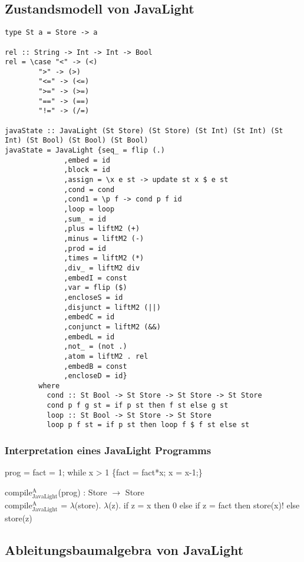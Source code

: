 \documentclass[11pt]{article}
\begin{document}
\subsection{Zustandsmodell von JavaLight}
\label{sec-11-4}

\begin{verbatim}
type St a = Store -> a

rel :: String -> Int -> Int -> Bool
rel = \case "<" -> (<)
	    ">" -> (>)
	    "<=" -> (<=)
	    ">=" -> (>=)
	    "==" -> (==)
	    "!=" -> (/=)

javaState :: JavaLight (St Store) (St Store) (St Int) (St Int) (St Int) (St Bool) (St Bool) (St Bool)
javaState = JavaLight {seq_ = flip (.)
		      ,embed = id
		      ,block = id
		      ,assign = \x e st -> update st x $ e st
		      ,cond = cond
		      ,cond1 = \p f -> cond p f id
		      ,loop = loop
		      ,sum_ = id
		      ,plus = liftM2 (+)
		      ,minus = liftM2 (-)
		      ,prod = id
		      ,times = liftM2 (*)
		      ,div_ = liftM2 div
		      ,embedI = const
		      ,var = flip ($)
		      ,encloseS = id
		      ,disjunct = liftM2 (||)
		      ,embedC = id
		      ,conjunct = liftM2 (&&)
		      ,embedL = id
		      ,not_ = (not .)
		      ,atom = liftM2 . rel
		      ,embedB = const
		      ,encloseD = id}
	    where
	      cond :: St Bool -> St Store -> St Store -> St Store
	      cond p f g st = if p st then f st else g st
	      loop :: St Bool -> St Store -> St Store
	      loop p f st = if p st then loop f $ f st else st
\end{verbatim}

\subsubsection{Interpretation eines JavaLight Programms}
\label{sec-11-4-1}

prog = fact = 1; while x > 1 \{fact = fact*x; x = x-1;\}

compile$^{\text{A}}_{\text{JavaLight}}$(prog) : Store $\to$ Store \\
compile$^{\text{A}}_{\text{JavaLight}}$ = $\lambda$(store). $\lambda$(z). if z = x then 0 else if z = fact then store(x)! else store(z)

\subsection{Ableitungsbaumalgebra von JavaLight}
\label{sec-11-5}
\end{document}
